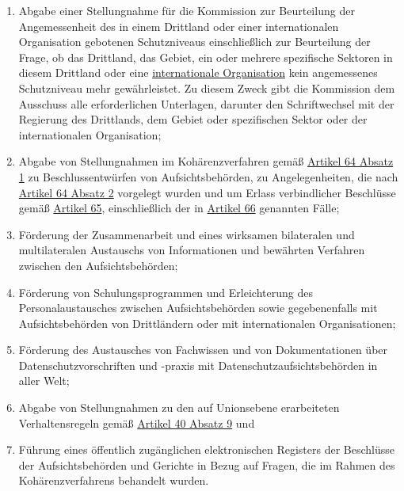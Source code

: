 \begin{enumerate}
\begin{enumerate}
    \item Abgabe einer Stellungnahme für die Kommission zur Beurteilung der Angemessenheit des in einem Drittland oder
     einer internationalen Organisation gebotenen Schutzniveaus einschließlich zur Beurteilung der Frage, ob das
     Drittland, das Gebiet, ein oder mehrere spezifische Sektoren in diesem Drittland oder eine \hyperref[itm:04-29]{internationale
     Organisation} kein angemessenes Schutzniveau mehr gewährleistet. Zu diesem Zweck gibt die Kommission dem Ausschuss
     alle erforderlichen Unterlagen, darunter den Schriftwechsel mit der Regierung des Drittlands, dem Gebiet oder
     spezifischen Sektor oder der internationalen Organisation;
    \label{itm:70-1s}

    \item Abgabe von Stellungnahmen im Kohärenzverfahren gemäß \hyperref[itm:64-1]{Artikel 64 Absatz 1} zu
     Beschlussentwürfen von Aufsichtsbehörden, zu Angelegenheiten, die nach \hyperref[itm:64-2]{Artikel 64 Absatz 2}
     vorgelegt wurden und um Erlass verbindlicher Beschlüsse gemäß \hyperref[ch:65]{Artikel 65}, einschließlich der
     in \hyperref[ch:66]{Artikel 66} genannten Fälle;
    \label{itm:70-1t}

    \item Förderung der Zusammenarbeit und eines wirksamen bilateralen und multilateralen Austauschs von Informationen
     und bewährten Verfahren zwischen den Aufsichtsbehörden;
    \label{itm:70-1u}

    \item Förderung von Schulungsprogrammen und Erleichterung des Personalaustausches zwischen Aufsichtsbehörden sowie
     gegebenenfalls mit Aufsichtsbehörden von Drittländern oder mit internationalen Organisationen;
    \label{itm:70-1v}

    \item Förderung des Austausches von Fachwissen und von Dokumentationen über Datenschutzvorschriften und -praxis mit
     Datenschutzaufsichtsbehörden in aller Welt;
    \label{itm:70-1w}

    \item Abgabe von Stellungnahmen zu den auf Unionsebene erarbeiteten Verhaltensregeln gemäß \hyperref[itm:40-9]
     {Artikel 40 Absatz 9} und
    \label{itm:70-1x}

    \item Führung eines öffentlich zugänglichen elektronischen Registers der Beschlüsse der Aufsichtsbehörden und
     Gerichte in Bezug auf Fragen, die im Rahmen des Kohärenzverfahrens behandelt wurden.
    \label{itm:70-1y}


\end{enumerate}
\end{enumerate}
